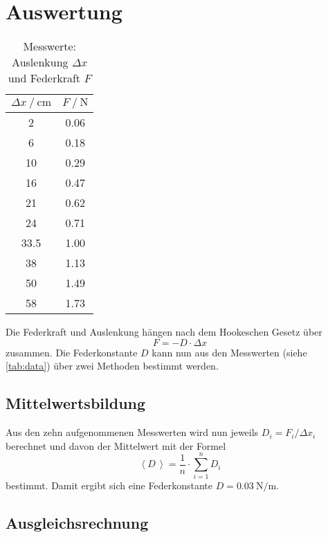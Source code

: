 \section{Auswertung}
\label{sec:Auswertung}
\begin{table}
  \centering
  \caption{Messwerte: Auslenkung $\Delta x $ und Federkraft $F$}
  \label{tab:data}
  \begin{tabular}{c c}
    \toprule 
    $\Delta x \:/\: \si{\centi\meter}$ & $F \:/\: \si{\newton}$ \\ 
    \midrule 
    2 & 0.06 \\
    6 & 0.18 \\
    10 & 0.29 \\
    16 & 0.47 \\
    21 & 0.62 \\
    24 & 0.71 \\
    33.5 & 1.00 \\
    38 & 1.13 \\
    50 & 1.49 \\
    58 & 1.73 \\ 
    \bottomrule
  \end{tabular}
\end{table} 
\noindent Die Federkraft und Auslenkung hängen nach dem Hookeschen Gesetz über
\begin{equation}
  \label{eq:Hook}
  F = - D \cdot \Delta x
\end{equation}
zusammen.
Die Federkonstante $D$ kann nun aus den Messwerten (siehe \autoref{tab:data}) über zwei Methoden bestimmt werden.

\newpage

\subsection{Mittelwertsbildung}
Aus den zehn aufgenommenen Messwerten wird nun jeweils $D_i = F_i / \Delta x_i$ berechnet und davon der Mittelwert mit der Formel
\begin{equation}
  \label{eq:Mittelwert}
  \left< D \, \right> = \frac{1}{n} \cdot \sum_{i=1}^{n} D_i
\end{equation}
bestimmt. Damit ergibt sich eine Federkonstante $D = \SI{0.03}{\newton\per\meter}$.

\subsection{Ausgleichsrechnung}

